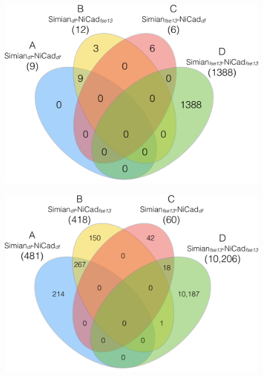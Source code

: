 \documentclass{IEEEtran}
\begin{document}
\begin{figure}
	\centering
	\begin{minipage}{.5\textwidth}
		\centering
		\includegraphics[width=0.7\linewidth]{venn4_pairs_good}
		\label{fig:venn4_orig_good}
	\end{minipage}%
	\begin{minipage}{.5\textwidth}
		\centering
		\includegraphics[width=0.7\linewidth]{venn4_pairs_ok}
		\label{fig:venn4_orig_ok}
	\end{minipage}
\end{figure}
\end{document}
